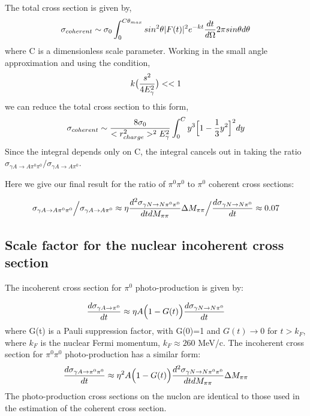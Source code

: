  
  The total cross section is given by, 
  $$ \sigma_{coherent} \sim \sigma_0 \int^{C\theta_{max}}_0 sin^2 \theta |F(t)|^2 e^{-kt} {dt \over d\Omega} 2\pi sin\theta d\theta$$ 
  where C is a dimensionless scale parameter. Working in the small angle approximation
  and using the condition, 
 $$k\big( {s^2 \over 4 E^2_\gamma} \big) <<1$$
 we can reduce the total cross section  to this form, 
  $$ \sigma_{coherent} \sim {8\sigma_0 \over <r^2_{charge}>^2E^2_\gamma}
  \int^C_0 y^3 \Big[1- {1 \over 3} y^2 \Big]^2 dy  $$ 
  Since the integral depends only on C, the integral cancels out in taking the ratio
  $\sigma_{\gamma A \rightarrow A \pi^0 \pi^0}   \Big/  \sigma_{\gamma A \rightarrow A \pi^0} $. 
  
  Here we give our final result for the ratio of  $\pi^0 \pi^0$ to $\pi^0$  coherent cross sections:

$$  \sigma_{\gamma A \rightarrow A \pi^0 \pi^0}   \Big/  \sigma_{\gamma A \rightarrow A \pi^0}  \approx \eta 
 {d^2\sigma_{\gamma N \rightarrow N \pi^0 \pi^0} \over dt dM_{\pi \pi} } \Delta M_{\pi \pi} \Big/ { d\sigma_{\gamma N \rightarrow N \pi^0} \over dt} \approx 0.07 $$

\subsection{Scale factor for the nuclear incoherent cross section}

The incoherent cross section for  $\pi^0$ photo-production is given by: 

$$ {d\sigma_{\gamma A \rightarrow   \pi^0 } \over dt } \approx \eta A \Big(1 -G(t) \Big){ d\sigma_{\gamma N \rightarrow N \pi^0 } \over dt } $$
where G(t) is a Pauli suppression factor, with G(0)=1 and $G(t)\rightarrow 0$ for $t> k_F$, where $k_F$ is the nuclear Fermi momentum, $k_F\approx 260$ MeV/c. The incoherent cross section for  $\pi^0 \pi^0$ photo-production has a similar form: 
$$ {d\sigma_{\gamma A \rightarrow   \pi^0 \pi^0 } \over dt } \approx \eta^2 A \Big(1 -G(t) \Big){ d^2\sigma_{\gamma N \rightarrow N \pi^0 \pi^0 } \over dt dM_{\pi \pi}} \Delta M_{\pi \pi} $$
The photo-production cross sections on the nuclon are identical to those used in the estimation of the coherent cross section.   

